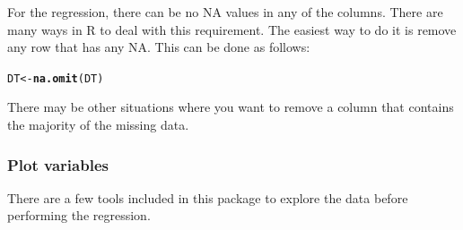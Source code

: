 \documentclass[a4paper,11pt]{article}\usepackage[]{graphicx}\usepackage[]{color}
\makeatletter
\newcommand{\hlstd}[1]{\textcolor[rgb]{0.345,0.345,0.345}{#1}}%
\newcommand{\hlkwb}[1]{\textcolor[rgb]{0.69,0.353,0.396}{#1}}%
\newcommand{\hlkwd}[1]{\textcolor[rgb]{0.737,0.353,0.396}{\textbf{#1}}}%
\newenvironment{kframe}{%
 \def\at@end@of@kframe{}%
 \ifinner\ifhmode%
  \def\at@end@of@kframe{\end{minipage}}%
  \begin{minipage}{\columnwidth}%
 \fi\fi%
 \def\FrameCommand##1{\hskip\@totalleftmargin \hskip-\fboxsep
 \colorbox{shadecolor}{##1}\hskip-\fboxsep
     \hskip-\linewidth \hskip-\@totalleftmargin \hskip\columnwidth}%
 \MakeFramed {\advance\hsize-\width
   \@totalleftmargin\z@ \linewidth\hsize
   \@setminipage}}%
 {\par\unskip\endMakeFramed%
 \at@end@of@kframe}
\newenvironment{knitrout}{}{} %
\makeatother
\begin{document}
For the regression, there can be no NA values in any of the columns. There are many ways in R to deal with this requirement. The easiest way to do it is remove any row that has any NA. This can be done as follows:

\begin{knitrout}
\color{fgcolor}\begin{kframe}
\begin{alltt}
\hlstd{DT} \hlkwb{<-} \hlkwd{na.omit}\hlstd{(DT)}
\end{alltt}
\end{kframe}
\end{knitrout}


There may be other situations where you want to remove a column that contains the majority of the missing data.

\subsubsection{Plot variables}
There are a few tools included in this package to explore the data before performing the regression.
\end{document}
